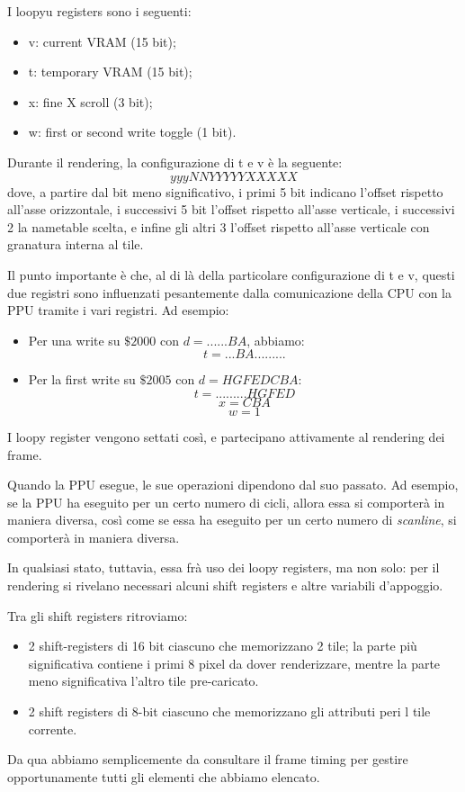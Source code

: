 \documentclass[11pt]{article}
\begin{document}
I loopyu registers sono i seguenti:
\begin{itemize}
\item{
v: current VRAM (15 bit);
}
\item{
t: temporary VRAM (15 bit);
}
\item{
x: fine X scroll (3 bit);
}
\item{
w: first or second write toggle (1 bit).
}
\end{itemize}
Durante il rendering, la configurazione di t e v è la seguente:
\[
	yyyNNYYYYYXXXXX
\]
dove, a partire dal bit meno significativo, i primi 5 bit indicano l'offset rispetto all'asse orizzontale, i successivi 5 bit l'offset rispetto all'asse verticale, i successivi 2 la nametable scelta, e infine gli altri 3 l'offset rispetto all'asse verticale con granatura interna al tile.

Il punto importante è che, al di là della particolare configurazione di t e v, questi due registri sono influenzati pesantemente dalla comunicazione della CPU con la PPU tramite i vari registri. Ad esempio:
\begin{itemize}
	\item{
		Per una write su $\$2000$ con $d=......BA$, abbiamo:
		\[
			t = ...BA.........
		\]
	}
	\item{
		Per la first write su $\$2005$ con $d=HGFEDCBA$:
		\[
			t = .........HGFED
		\]
		\[
			x = CBA
		\]
		\[
			w = 1
		\]
	}
\end{itemize}
I loopy register vengono settati così, e partecipano attivamente al rendering dei frame.

Quando la PPU esegue, le sue operazioni dipendono dal suo passato. Ad esempio, se la PPU ha eseguito per un certo numero di cicli, allora essa si comporterà in maniera diversa, così come se essa ha eseguito per un certo numero di \emph{scanline}, si comporterà in maniera diversa.

In qualsiasi stato, tuttavia, essa frà uso dei loopy registers, ma non solo: per il rendering si rivelano necessari alcuni shift registers e altre variabili d'appoggio.

Tra gli shift registers ritroviamo:
\begin{itemize}
	\item{
	2 shift-registers di 16 bit ciascuno che memorizzano 2 tile; la parte più significativa contiene i primi 8 pixel da dover renderizzare, mentre la parte meno significativa l'altro tile pre-caricato.
	}
	\item{
	2 shift registers di 8-bit ciascuno che memorizzano gli attributi peri l tile corrente.
	}
\end{itemize}
Da qua abbiamo semplicemente da consultare il frame timing per gestire opportunamente tutti gli elementi che abbiamo elencato.
\end{document}
